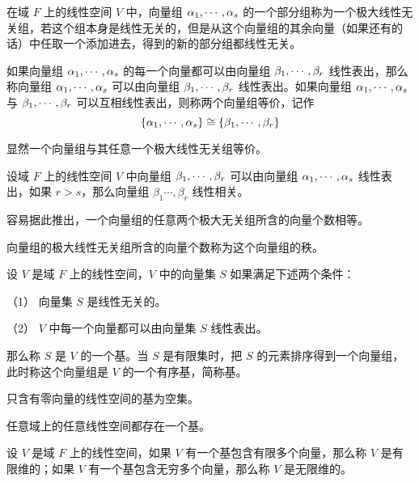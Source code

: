 \begin{definition}
	在域 $F$ 上的线性空间 $V$ 中，向量组 $\alpha_1,\cdots,\alpha_s$ 的一个部分组称为一个极大线性无关组，若这个组本身是线性无关的，但是从这个向量组的其余向量（如果还有的话）中任取一个添加进去，得到的新的部分组都线性无关。
\end{definition}

\begin{definition}
	如果向量组 $\alpha_1,\cdots,\alpha_s$ 的每一个向量都可以由向量组 $\beta_1,\cdots,\beta_r$ 线性表出，那么称向量组 $\alpha_1,\cdots,\alpha_s$ 可以由向量组 $\beta_1,\cdots,\beta_r$ 线性表出。如果向量组 $\alpha_1,\cdots,\alpha_s$ 与 $\beta_1,\cdots,\beta_r$ 可以互相线性表出，则称两个向量组等价，记作
	\[ \{ \alpha_1,\cdots,\alpha_s \} \cong \{\beta_1,\cdots,\beta_r\}\]
\end{definition}

显然一个向量组与其任意一个极大线性无关组等价。

\begin{theorem}
	设域 $F$ 上的线性空间 $V$ 中向量组 $\beta_1,\cdots,\beta_r$ 可以由向量组 $\alpha_1,\cdots,\alpha_s$ 线性表出，如果 $r>s$，那么向量组 $\beta_1\cdots,\beta_r$ 线性相关。
\end{theorem}

容易据此推出，一个向量组的任意两个极大无关组所含的向量个数相等。

\begin{definition}
	向量组的极大线性无关组所含的向量个数称为这个向量组的秩。
\end{definition}

\begin{definition}
	设 $V$ 是域 $F$ 上的线性空间，$V$ 中的向量集 $S$ 如果满足下述两个条件：
	
	（1） 向量集 $S$ 是线性无关的。
	
	（2） $V$ 中每一个向量都可以由向量集 $S$ 线性表出。
	
	那么称 $S$ 是 $V$ 的一个基。当 $S$ 是有限集时，把 $S$ 的元素排序得到一个向量组，此时称这个向量组是 $V$ 的一个有序基，简称基。
\end{definition}

只含有零向量的线性空间的基为空集。

\begin{theorem}
	任意域上的任意线性空间都存在一个基。
\end{theorem}

\begin{definition}
	设 $V$ 是域 $F$ 上的线性空间，如果 $V$ 有一个基包含有限多个向量，那么称 $V$ 是有限维的；如果 $V$ 有一个基包含无穷多个向量，那么称 $V$ 是无限维的。
\end{definition}

